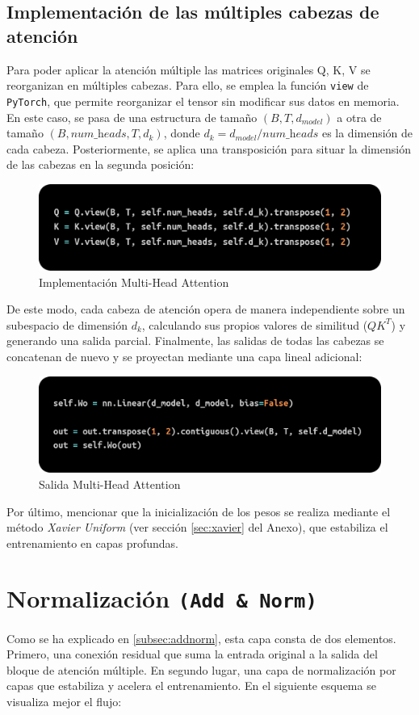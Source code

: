 \documentclass[11pt]{book}
\begin{document}
\subsection{Implementación de las múltiples cabezas de atención}
Para poder aplicar la atención múltiple las matrices originales Q, K, V se reorganizan en múltiples cabezas. Para ello, se emplea la función \texttt{view} de \texttt{PyTorch}, que permite reorganizar el tensor sin modificar sus datos en memoria. En este caso, se pasa de una estructura de tamaño $(B, T, d_{model})$ a otra de tamaño $(B, \textit{num\_heads}, T, d_k)$, donde $d_k = d_{model} / \textit{num\_heads}$ es la dimensión de cada cabeza. Posteriormente, se aplica una transposición para situar la dimensión de las cabezas en la segunda posición:

\begin{figure}[h]
    \centering
    \includegraphics[width=0.5\linewidth]{img/heads.png}
    \caption{Implementación Multi-Head Attention}
    \label{fig:placeholder11}
\end{figure}

De este modo, cada cabeza de atención opera de manera independiente sobre un subespacio de dimensión $d_k$, calculando sus propios valores de similitud ($QK^T$) y generando una salida parcial. Finalmente, las salidas de todas las cabezas se concatenan de nuevo y se proyectan mediante una capa lineal adicional:

\begin{figure}[h]
    \centering
    \includegraphics[width=0.5\linewidth]{img/heads2.png}
    \caption{Salida Multi-Head Attention}
    \label{fig:placeholder12}
\end{figure}

Por último, mencionar que la inicialización de los pesos se realiza mediante el método \textit{Xavier Uniform} (ver sección \ref{sec:xavier} del Anexo), que estabiliza el entrenamiento en capas profundas. 

\section{Normalización \texttt{(Add \& Norm)}}
Como se ha explicado en \ref{subsec:addnorm}, esta capa consta de dos elementos. Primero, una conexión residual que suma la entrada original a la salida del bloque de atención múltiple. En segundo lugar, una capa de normalización por capas que estabiliza y acelera el entrenamiento. En el siguiente esquema se visualiza mejor el flujo: 
\end{document}
